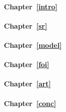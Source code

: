 \paragraph{Chapter~\ref{intro}}
\paragraph{Chapter~\ref{sr}}
\paragraph{Chapter~\ref{model}}
\paragraph{Chapter~\ref{foi}}
\paragraph{Chapter~\ref{art}}
\paragraph{Chapter~\ref{conc}}
